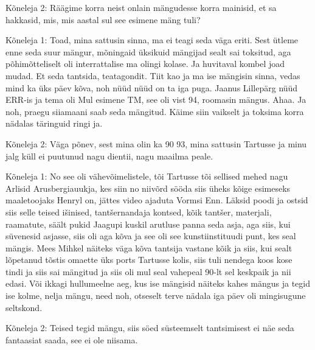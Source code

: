 Kõneleja 2:
Räägime korra neist onlain mängudesse korra mainisid, et sa hakkasid, mis, mis aastal sul see esimene mäng tuli?
                 
Kõneleja 1:
Toad, mina sattusin sinna, ma ei teagi seda väga eriti. Sest ütleme enne seda suur mängur, mõningaid üksikuid mängijad sealt sai toksitud, aga põhimõtteliselt oli interrattalise ma olingi kolase. Ja huvitaval kombel joad mudad.
Et seda tantsida, teatagondit. Tiit kao ja ma ise mängisin sinna, vedas mind ka üks päev kõva, noh nüüd nüüd on ta iga puga. Jaanus Lillepärg nüüd ERR-is ja tema oli Mul esimene TM, see oli vist 94, roomasin mängus. Ahaa. Ja noh, praegu siiamaani saab seda mängitud. Käime siin vaikselt ja toksima korra nädalas täringuid ringi ja.
                 
Kõneleja 2:
Väga põnev, sest mina olin ka 90 93, mina sattusin Tartusse ja minu jalg küll ei puutunud nagu dientii, nagu maailma peale.
                 
Kõneleja 1:
No see oli vähevõimelistele, tõi Tartusse tõi sellised mehed nagu Arlisid Arusbergiauukja, kes siin no niivõrd sööda siis üheks kõige esimeseks maaletoojaks Henryl on, jättes video ajaduta Vormsi Enn.
Läksid poodi ja ostsid siis selle teised išinised, tantšernandaja kontsed, kõik tantšer, materjali, raamatute, säält pukid Jaagupi kuskil arutluse panna seda asja, aga siis, kui süvenesid asjasse, siis oli aga kõva ja see oli see kunstiinstituudi punt, kes seal mängis. Mees Mihkel näiteks väga kõva tantsija vastane kõik ja siis, kui sealt lõpetanud tõstis omaette üks ports Tartusse kolis, siis tuli nendega koos kose tindi ja siis sai mängitud ja siis oli mul seal vahepeal 90-lt sel keskpaik ja nii edasi. Või ikkagi hullumeelne aeg, kus ise mängisid näiteks kahes mängus ja tegid ise kolme, nelja mängu, need noh, otseselt terve nädala iga päev oli mingisugune seltskond.
                 
Kõneleja 2:
Teised tegid mängu, siis söed süsteemselt tantsimisest ei näe seda fantaasiat saada, see ei ole niisama.
                 
